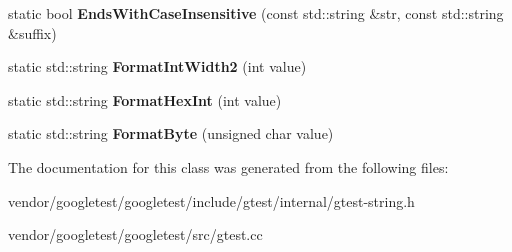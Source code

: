 \begin{DoxyCompactItemize}
\mbox{\label{classtesting_1_1internal_1_1_string_a968f242b709f8c7c0ed5ecf246553321}} 
static bool {\bfseries Ends\+With\+Case\+Insensitive} (const std\+::string \&str, const std\+::string \&suffix)
\item 
\mbox{\label{classtesting_1_1internal_1_1_string_af50b18d588355871e1982c4043523e0f}} 
static std\+::string {\bfseries Format\+Int\+Width2} (int value)
\item 
\mbox{\label{classtesting_1_1internal_1_1_string_affe59102e49092fc0684388e9b0c5c1e}} 
static std\+::string {\bfseries Format\+Hex\+Int} (int value)
\item 
\mbox{\label{classtesting_1_1internal_1_1_string_af702dc7cbd569589d8e3ff215a7cafa9}} 
static std\+::string {\bfseries Format\+Byte} (unsigned char value)
\end{DoxyCompactItemize}


The documentation for this class was generated from the following files\+:\begin{DoxyCompactItemize}
\item 
vendor/googletest/googletest/include/gtest/internal/gtest-\/string.\+h\item 
vendor/googletest/googletest/src/gtest.\+cc\end{DoxyCompactItemize}
